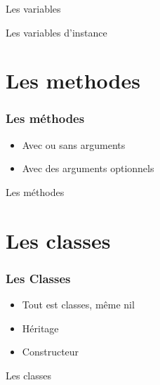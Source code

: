 \documentclass{beamer}
\begin{document}
\begin{frame}
  \begin{beamerboxesrounded}{Les variables}
    
  \end{beamerboxesrounded}
\end{frame}

\begin{frame}
  \begin{beamerboxesrounded}{Les variables d'instance}
    
  \end{beamerboxesrounded}
\end{frame}


\section{Les methodes}

\begin{frame}
  \frametitle{Les m\'ethodes}
  \begin{itemize}
    \item Avec ou sans arguments
    \item Avec des arguments optionnels
  \end{itemize}
\end{frame}

\begin{frame}
  \begin{beamerboxesrounded}{Les m\'ethodes}
    
  \end{beamerboxesrounded}
\end{frame}

\section{Les classes}

\begin{frame}
  \frametitle{Les Classes}
  \begin{itemize}
    \item Tout est classes, même nil
    \item H\'eritage
    \item Constructeur
  \end{itemize}
\end{frame}

\begin{frame}
  \begin{beamerboxesrounded}{Les classes}
    
  \end{beamerboxesrounded}
\end{frame}
\end{document}
